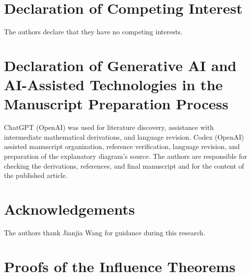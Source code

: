\documentclass[preprint,11pt]{elsarticle}
\begin{document}
\section*{Declaration of Competing Interest}
The authors declare that they have no competing interests.

\section*{Declaration of Generative AI and AI-Assisted Technologies
in the Manuscript Preparation Process}
ChatGPT (OpenAI) was used for literature discovery, assistance with
intermediate mathematical derivations, and language revision.
Codex (OpenAI) assisted manuscript organization, reference verification,
language revision, and preparation of the explanatory diagram's source.
The authors are responsible for checking the derivations, references,
and final manuscript and for the content of the published article.

\section*{Acknowledgements}
The authors thank Jianjia Wang for guidance during this research.




\appendix
\renewcommand{\thesection}{\Alph{section}}
\makeatletter
\renewcommand{\@seccntformat}[1]{\ifstrequal{#1}{section}{Appendix~}{}\csname the#1\endcsname.\quad}
\makeatother
{}

\section{Proofs of the Influence Theorems}\label{app:proofs-influence}
\end{document}
